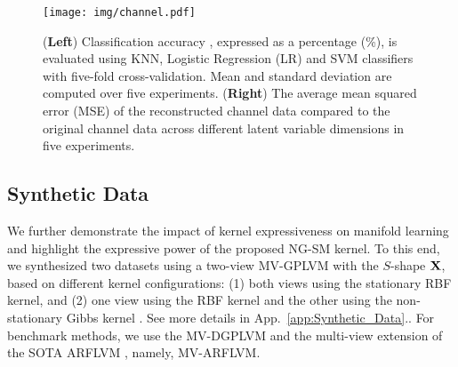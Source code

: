 \begin{figure*}[t!]
    \centering
    \caption{(\textbf{Left}) Classification accuracy , expressed as a percentage (\%), is evaluated using KNN, Logistic Regression (LR) and SVM classifiers with five-fold cross-validation. Mean and standard deviation are computed over five experiments. (\textbf{Right}) The average mean squared error (\MakeUppercase{mse}) of the reconstructed channel data compared to the original channel data across different latent variable dimensions in five experiments.
    \vspace{-.15in}
    }
    \centering
    \texttt{[image: img/channel.pdf]} 
    \vspace{-0.09in}
    \label{fig:channel_bar_chart}
\end{figure*}
%
\vspace{-0.09in}
\subsection{Synthetic Data}
\label{subsec:toy_example}
\vspace{-0.09in}
We further demonstrate the impact of kernel expressiveness on manifold learning and highlight the expressive power of the proposed NG-SM kernel. 
To this end, we synthesized two datasets using a two-view MV-GPLVM with the $S$-shape ${\mathbf X}$, based on different kernel configurations: (1) both views using the stationary \MakeUppercase{rbf} kernel, and (2) one view using the \MakeUppercase{rbf} kernel and the other using the non-stationary Gibbs kernel \citep{williams2006gaussian}. {See more details in App.~\ref{app:Synthetic_Data}.}. For benchmark methods, we use the MV-DGPLVM \citep{sun2020multi} and the multi-view extension of the SOTA \MakeUppercase{arflvm} \citep{li2024preventing}, namely, \MakeUppercase{mv-arflvm}.

